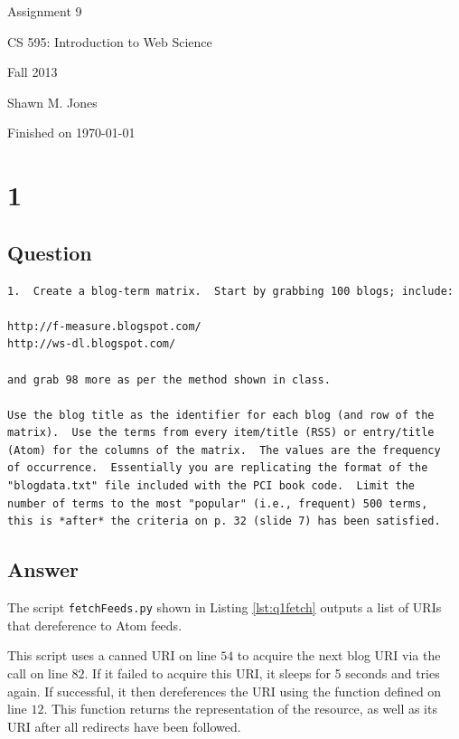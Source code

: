 \documentclass[letterpaper,11pt]{article}
\begin{document}
\begin{titlepage}

\begin{center}

\Huge{Assignment 9}

\Large{CS 595:  Introduction to Web Science}

\Large{Fall 2013}

\Large{Shawn M. Jones}

\Large Finished on \today

\end{center}

\end{titlepage}

\newpage


\newpage
\section*{1}

\subsection*{Question}

\begin{verbatim}
1.  Create a blog-term matrix.  Start by grabbing 100 blogs; include:

http://f-measure.blogspot.com/
http://ws-dl.blogspot.com/

and grab 98 more as per the method shown in class.

Use the blog title as the identifier for each blog (and row of the
matrix).  Use the terms from every item/title (RSS) or entry/title
(Atom) for the columns of the matrix.  The values are the frequency
of occurrence.  Essentially you are replicating the format of the
"blogdata.txt" file included with the PCI book code.  Limit the
number of terms to the most "popular" (i.e., frequent) 500 terms,
this is *after* the criteria on p. 32 (slide 7) has been satisfied.
\end{verbatim}

\subsection*{Answer}

The script \verb+fetchFeeds.py+ shown in Listing \ref{lst:q1fetch} outputs a list of URIs that dereference to Atom feeds.  

This script uses a canned URI on line $54$ to acquire the next blog URI via the call on line $82$.  If it failed to acquire this URI, it sleeps for 5 seconds and tries again.  If successful, it then dereferences the URI using the function defined on line $12$.  This function returns the representation of the resource, as well as its URI after all redirects have been followed.  
\end{document}
